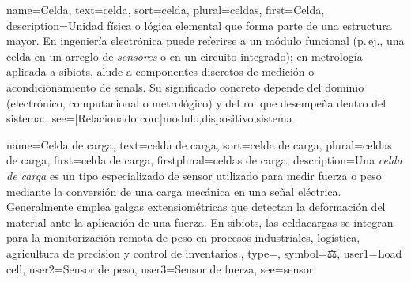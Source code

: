 	
	{
		name={Celda},
		text={celda},
		sort={celda},
		plural={celdas},
		first={Celda},
		description={Unidad f{\'i}sica o l{\'o}gica elemental que forma parte de una estructura mayor. 
			En ingenier{\'i}a electr{\'o}nica puede referirse a un m{\'o}dulo funcional (p.\,ej., una celda en un arreglo de \textit{sensores} o en un circuito integrado); 
			en metrolog{\'i}a aplicada a \glspl{sibiot}, alude a componentes discretos de medici{\'o}n o acondicionamiento de \glspl{senal}. 
			Su significado concreto depende del dominio (electr{\'o}nico, computacional o metrol{\'o}gico) y del rol que desempe{\~n}a dentro del \gls{sistema}.},
		see=[Relacionado con:]{modulo,dispositivo,sistema}
	}
	
	{
		name={Celda de carga},
		text={celda de carga},
		sort={celda de carga},
		plural={celdas de carga},
		first={celda de carga},
		firstplural={celdas de carga},
		description={Una \emph{celda de carga} es un tipo especializado de \gls{sensor} utilizado para medir fuerza o peso mediante la conversi{\'o}n de una carga mec{\'a}nica en una se{\~n}al el{\'e}ctrica. Generalmente emplea galgas extensiom{\'e}tricas que detectan la deformaci{\'o}n del material ante la aplicaci{\'o}n de una fuerza. En \glspl{sibiot}, las \glspl{celdacarga} se integran para la monitorizaci{\'o}n remota de peso en procesos industriales, log{\'i}stica, agricultura de \gls{precision} y control de inventarios.},
		type=\glsdefaulttype,
		symbol={⚖️},
		user1={Load cell},
		user2={Sensor de peso},
		user3={Sensor de fuerza},
		see={sensor}
	}
	
